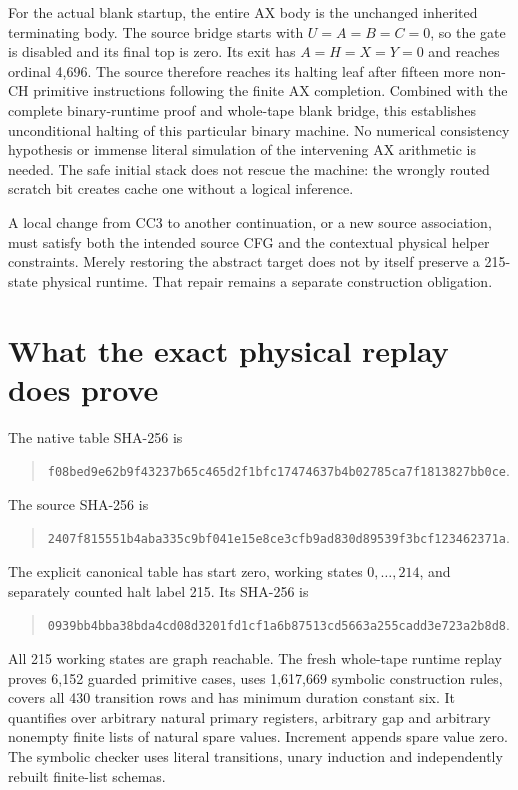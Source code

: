 \documentclass[11pt]{article}
\begin{document}
For the actual blank startup, the entire AX body is the unchanged inherited terminating body. The source bridge starts with $U=A=B=C=0$, so the gate is disabled and its final top is zero. Its exit has $A=H=X=Y=0$ and reaches ordinal 4,696. The source therefore reaches its halting leaf after fifteen more non-CH primitive instructions following the finite AX completion. Combined with the complete binary-runtime proof and whole-tape blank bridge, this establishes unconditional halting of this particular binary machine. No numerical consistency hypothesis or immense literal simulation of the intervening AX arithmetic is needed. The safe initial stack does not rescue the machine: the wrongly routed scratch bit creates cache one without a logical inference.

A local change from $\mathrm{CC}3$ to another continuation, or a new source association, must satisfy both the intended source CFG and the contextual physical helper constraints. Merely restoring the abstract target does not by itself preserve a 215-state physical runtime. That repair remains a separate construction obligation.

\section{What the exact physical replay does prove}
The native table SHA-256 is
\begin{quote}\small\ttfamily
\nolinkurl{f08bed9e62b9f43237b65c465d2f1bfc17474637b4b02785ca7f1813827bb0ce}.
\end{quote}
The source SHA-256 is
\begin{quote}\small\ttfamily
\nolinkurl{2407f815551b4aba335c9bf041e15e8ce3cfb9ad830d89539f3bcf123462371a}.
\end{quote}
The explicit canonical table has start zero, working states $0,\ldots,214$, and separately counted halt label 215. Its SHA-256 is
\begin{quote}\small\ttfamily
\nolinkurl{0939bb4bba38bda4cd08d3201fd1cf1a6b87513cd5663a255cadd3e723a2b8d8}.
\end{quote}
All 215 working states are graph reachable. The fresh whole-tape runtime replay proves 6,152 guarded primitive cases, uses 1,617,669 symbolic construction rules, covers all 430 transition rows and has minimum duration constant six. It quantifies over arbitrary natural primary registers, arbitrary gap and arbitrary nonempty finite lists of natural spare values. Increment appends spare value zero. The symbolic checker uses literal transitions, unary induction and independently rebuilt finite-list schemas.
\end{document}
